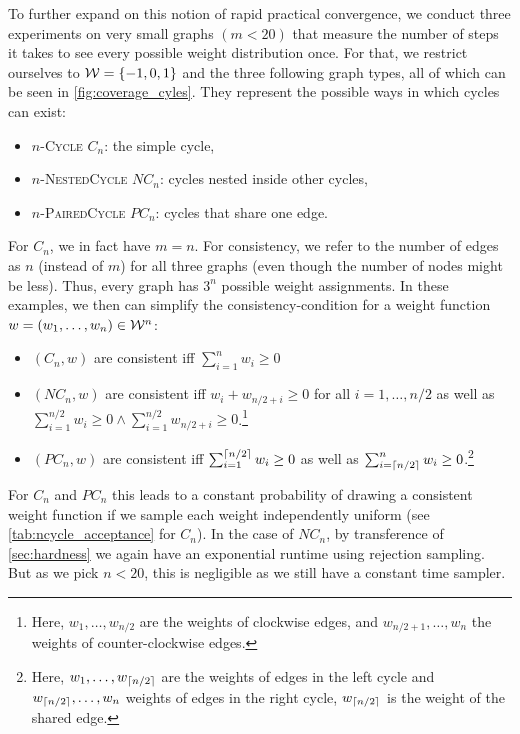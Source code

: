 To further expand on this notion of rapid practical convergence, we conduct three experiments on very small graphs $(m < 20)$ that measure the number of steps it takes to see every possible weight distribution once.
For that, we restrict ourselves to $\mathcal W = \left\{-1, 0, 1\right\}$ and the three following graph types, all of which can be seen in \cref{fig:coverage_cyles}.
They represent the possible ways in which cycles can exist: \begin{itemize}
  \item $n$-\textsc{Cycle} $C_n$: the simple cycle,
  \item $n$-\textsc{NestedCycle} $NC_n$: cycles nested inside other cycles,
  \item $n$-\textsc{PairedCycle} $PC_n$: cycles that share one edge.
\end{itemize}
For $C_n$, we in fact have $m = n$.
For consistency, we refer to the number of edges as $n$ (instead of $m$) for all three graphs (even though the number of nodes might be less).
Thus, every graph has $3^n$ possible weight assignments.
In these examples, we then can simplify the consistency-condition for a weight function $w = (w_1, \ldots, w_n) \in \mathcal W^n$: \begin{itemize}
  \item $(C_n,w)$ are consistent iff $\sum_{i=1}^{n}w_i \geq 0$
  \item $(NC_n,w)$ are consistent iff $w_i + w_{n/2 + i} \geq 0$ for all $i = 1,\ldots,n/2$ as well as $\sum_{i = 1}^{n/2}w_i \geq 0 \land \sum_{i = 1}^{n/2}w_{n/2 + i} \geq 0$.\footnote{
    Here, $w_1,\ldots,w_{n/2}$ are the weights of clockwise edges, and $w_{n/2 + 1},\ldots,w_n$ the weights of counter-clockwise edges.
  }
  \item $(PC_n,w)$ are consistent iff $\sum_{i = 1}^{\left\lceil n/2\right\rceil}w_i \geq 0$ as well as $\sum_{i = \left\lceil n/2\right\rceil}^{n}w_i \geq 0$.\footnote{
    Here, $w_1,\ldots,w_{\left\lceil n/2\right\rceil}$ are the weights of edges in the left cycle and $w_{\left\lceil n/2\right\rceil},\ldots,w_n$ weights of edges in the right cycle, $w_{\left\lceil n/2\right\rceil}$ is the weight of the shared edge.
  }
\end{itemize}

For $C_n$ and $PC_n$ this leads to a constant probability of drawing a consistent weight function if we sample each weight independently uniform (see \cref{tab:ncycle_acceptance} for $C_n$).
In the case of $NC_n$, by transference of \cref{sec:hardness} we again have an exponential runtime using rejection sampling.
But as we pick $n < 20$, this is negligible as we still have a constant time sampler.

